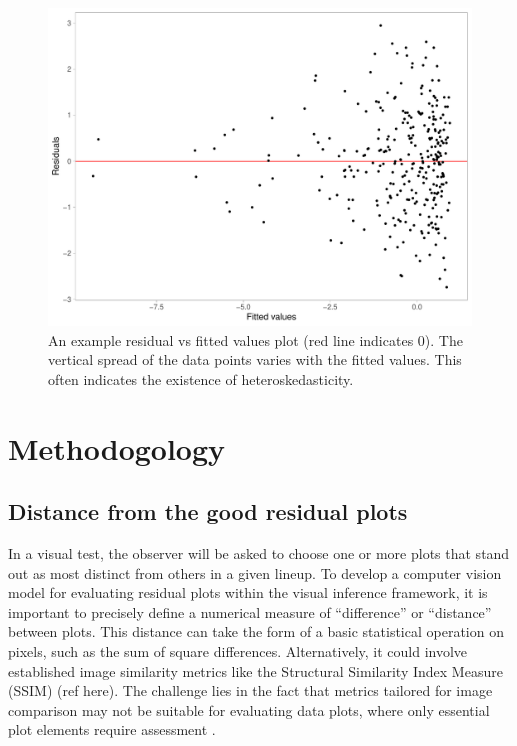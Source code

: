 \documentclass[]{interact}
\theoremstyle{plain}%
\theoremstyle{definition}
\theoremstyle{remark}
\begin{document}
\begin{figure}

{\centering \includegraphics[width=1\linewidth]{paper_files/figure-latex/false-finding-1} 

}

\caption{An example residual vs fitted values plot (red line indicates 0). The vertical spread of the data points varies with the fitted values. This often indicates the existence of heteroskedasticity.}\label{fig:false-finding}
\end{figure}

\hypertarget{methodogology}{%
\section{Methodogology}\label{methodogology}}

\hypertarget{distance-from-the-good-residual-plots}{%
\subsection{Distance from the good residual
plots}\label{distance-from-the-good-residual-plots}}

In a visual test, the observer will be asked to choose one or more plots
that stand out as most distinct from others in a given lineup. To
develop a computer vision model for evaluating residual plots within the
visual inference framework, it is important to precisely define a
numerical measure of ``difference'' or ``distance'' between plots. This
distance can take the form of a basic statistical operation on pixels,
such as the sum of square differences. Alternatively, it could involve
established image similarity metrics like the Structural Similarity
Index Measure (SSIM) (ref here). The challenge lies in the fact that
metrics tailored for image comparison may not be suitable for evaluating
data plots, where only essential plot elements require assessment
\citep{chowdhury2018measuring}.
\end{document}
